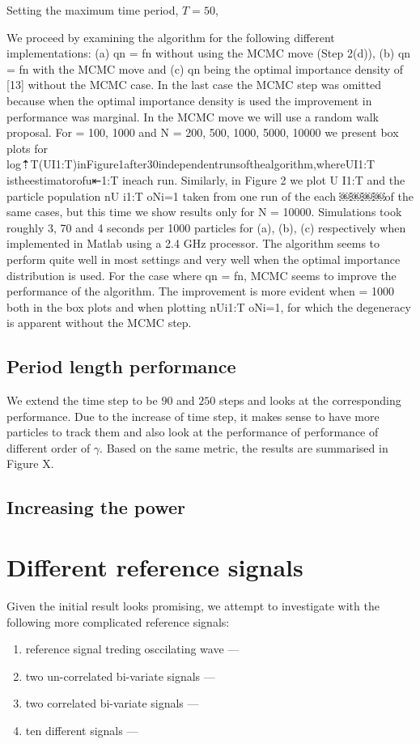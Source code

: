 Setting the maximum time period, $T=50$, 

We proceed by examining the algorithm for the following different implementations: (a) qn = fn without
using the MCMC move (Step 2(d)), (b) qn = fn with the MCMC move and (c) qn being the optimal importance density of [13] without the MCMC case. In the last case the MCMC step was omitted because when the optimal importance density is used the improvement in performance was marginal. In the MCMC move we will use a random walk proposal. For  = 100, 1000 and N = 200, 500, 1000, 5000, 10000 we present box plots for
log⇡T(UI1:T)inFigure1after30independentrunsofthealgorithm,whereUI1:T istheestimatorofu⇤1:T ineach run. Similarly, in Figure 2 we plot U I1:T and the particle population nU i1:T oNi=1 taken from one run of the each
￼￼￼￼of the same cases, but this time we show results only for N = 10000. Simulations took roughly 3, 70 and 4 seconds per 1000 particles for (a), (b), (c) respectively when implemented in Matlab using a 2.4 GHz processor. The algorithm seems to perform quite well in most settings and very well when the optimal importance distribution is used. For the case where qn = fn, MCMC seems to improve the performance of the algorithm.
The improvement is more evident when  = 1000 both in the box plots and when plotting nUi1:T oNi=1, for which the degeneracy is apparent without the MCMC step.

\subsection{Period length performance}
We extend the time step to be $90$ and $250$ steps and looks at the corresponding performance. Due to the increase of time step, it makes sense to have more particles to track them and also look at the performance of performance of different order of $\gamma$. Based on the same metric, the results are summarised in Figure X.

\subsection{Increasing the power}

\section{Different reference signals}
Given the initial result looks promising, we attempt to investigate with the following more complicated reference signals:
\begin{enumerate}
\item reference signal treding osccilating wave ---
\item two un-correlated bi-variate signals ---
\item two correlated bi-variate signals ---
\item ten different signals ---
\end{enumerate}

